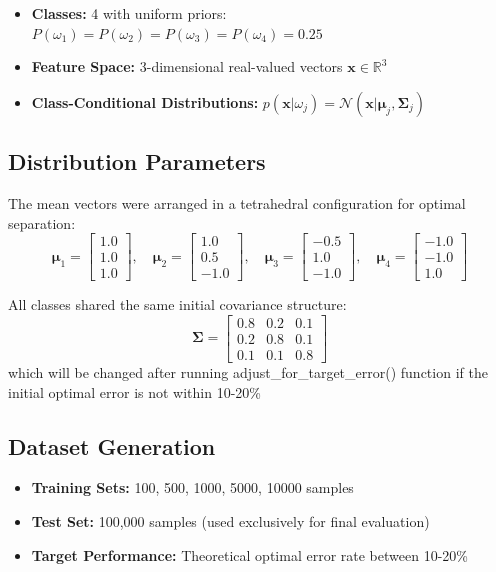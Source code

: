 \documentclass[12pt]{article}
\begin{document}
\begin{itemize}
    \item \textbf{Classes:} 4 with uniform priors: $P(\omega_1) = P(\omega_2) = P(\omega_3) = P(\omega_4) = 0.25$
    \item \textbf{Feature Space:} 3-dimensional real-valued vectors $\mathbf{x} \in \mathbb{R}^3$
    \item \textbf{Class-Conditional Distributions:} $p(\mathbf{x}|\omega_j) = \mathcal{N}(\mathbf{x}|\boldsymbol{\mu}_j, \boldsymbol{\Sigma}_j)$
\end{itemize}

\subsection{Distribution Parameters}
The mean vectors were arranged in a tetrahedral configuration for optimal separation:
\[
\boldsymbol{\mu}_1 = \begin{bmatrix} 1.0 \\ 1.0 \\ 1.0 \end{bmatrix}, \quad
\boldsymbol{\mu}_2 = \begin{bmatrix} 1.0 \\ 0.5 \\ -1.0 \end{bmatrix}, \quad  %
\boldsymbol{\mu}_3 = \begin{bmatrix} -0.5 \\ 1.0 \\ -1.0 \end{bmatrix}, \quad  %
\boldsymbol{\mu}_4 = \begin{bmatrix} -1.0 \\ -1.0 \\ 1.0 \end{bmatrix}
\]

All classes shared the same initial covariance structure:
\[
\boldsymbol{\Sigma} = \begin{bmatrix}
0.8 & 0.2 & 0.1 \\
0.2 & 0.8 & 0.1 \\
0.1 & 0.1 & 0.8
\end{bmatrix}
\]
which will be changed after running adjust\_for\_target\_error() function if the initial optimal error is not within 10-20\%
\subsection{Dataset Generation}
\begin{itemize}
    \item \textbf{Training Sets:} 100, 500, 1000, 5000, 10000 samples
    \item \textbf{Test Set:} 100,000 samples (used exclusively for final evaluation)
    \item \textbf{Target Performance:} Theoretical optimal error rate between 10-20\%
\end{itemize}
\end{document}
